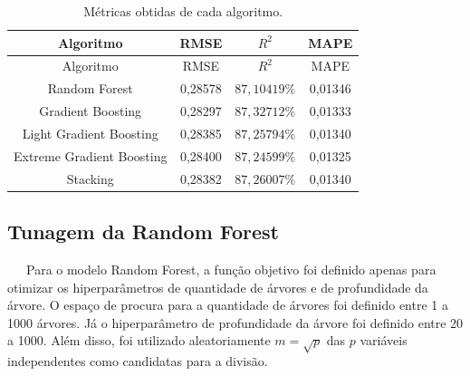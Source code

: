 \documentclass[
  12pt,
  a4paper,
]{scrreprt}
\begin{document}
\begin{longtable}[]{@{}cccc@{}}
\caption{Métricas obtidas de cada
algoritmo.}\label{tbl-metrics_models}\tabularnewline
\toprule\noalign{}
Algoritmo & RMSE & \(R^2\) & MAPE \\
\midrule\noalign{}
\endfirsthead
\toprule\noalign{}
Algoritmo & RMSE & \(R^2\) & MAPE \\
\midrule\noalign{}
\endhead
\bottomrule\noalign{}
\endlastfoot
Random Forest & 0,28578 & \(87,10419\%\) & 0,01346 \\
Gradient Boosting & 0,28297 & \(87,32712\%\) & 0,01333 \\
Light Gradient Boosting & 0,28385 & \(87,25794\%\) & 0,01340 \\
Extreme Gradient Boosting & 0,28400 & \(87,24599\%\) & 0,01325 \\
Stacking & 0,28382 & \(87,26007\%\) & 0,01340 \\
\end{longtable}

\subsection{Tunagem da Random Forest}\label{tunagem-da-random-forest}

~~~Para o modelo Random Forest, a função objetivo foi definido apenas
para otimizar os hiperparâmetros de quantidade de árvores e de
profundidade da árvore. O espaço de procura para a quantidade de árvores
foi definido entre 1 a 1000 árvores. Já o hiperparâmetro de profundidade
da árvore foi definido entre 20 a 1000. Além disso, foi utilizado
aleatoriamente \(m = \sqrt{p}\) das \(p\) variáveis independentes como
candidatas para a divisão.
\end{document}
